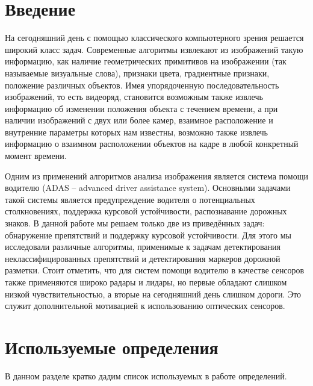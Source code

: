 \documentclass[aps,%
14pt,%
final,%
oneside,
onecolumn,%
musixtex, %
superscriptaddress,%
centertags]{extarticle} %
\begin{document}
\tableofcontents

\section*{Введение}





На сегодняшний день с помощью классического компьютерного зрения решается широкий класс задач. Современные алгоритмы извлекают из изображений такую информацию, как наличие геометрических примитивов на изображении (так называемые визуальные слова), признаки цвета, градиентные признаки, положение различных объектов. Имея упорядоченную последовательность изображений, то есть видеоряд, становится возможным также извлечь информацию об изменении положения объекта с течением времени, а при наличии изображений с двух или более камер, взаимное расположение и внутренние параметры которых нам известны, возможно также извлечь информацию о взаимном расположении объектов на кадре в любой конкретный момент времени.

Одним из применений алгоритмов анализа изображения является система помощи водителю (ADAS -- advanced driver assistance system). Основными задачами такой системы является предупреждение водителя о потенциальных столкновениях, поддержка курсовой устойчивости, распознавание дорожных знаков. В данной работе мы решаем только две из приведённых задач: обнаружение препятствий и поддержку курсовой устойчивости. Для этого мы исследовали различные алгоритмы, применимые к задачам детектирования неклассифицированных препятствий и детектирования маркеров дорожной разметки. Стоит отметить, что для систем помощи водителю в качестве сенсоров также применяются широко радары и лидары, но первые обладают слишком низкой чувствительностью, а вторые на сегодняшний день слишком дороги. Это служит дополнительной мотивацией к использованию оптических сенсоров.

\section{Используемые определения}




В данном разделе кратко дадим список используемых в работе определений.
\end{document}

